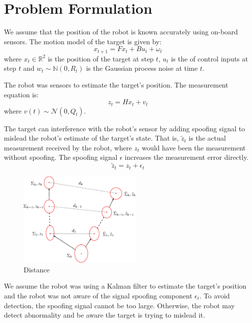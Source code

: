 \documentclass[letterpaper, 10 pt, conference]{ieeeconf}  %
\begin{document}
\section{Problem Formulation} \label{sec:probform}

We assume that the position of the robot is known accurately using on-board sensors. The motion model of the target is given by:
\begin{equation}  \label{robot}
  x_{t+1}=Fx_{t}+Bu_t+\omega_t
\end{equation}   
where $x_{t}\in\mathbb{R}^2$ is the position of the target at step $t$, $u_t$ is the of control inputs at step $t$ and $w_t\sim \mathbb{N}(0, R_t)$ is the Gaussian process noise at time $t$. 

The robot was sensors to estimate the target's position. The measurement equation is:
\begin{equation}
  \label{measurement}
   z_t= Hx_t +v_t
\end{equation}
where  $v(t) \sim \mathcal{N}(0,Q_t)$.

The target can interference with the robot's sensor by adding spoofing signal to mislead the robot's estimate of the target's state. That is, $\tilde{z}_t$ is the actual measurement received by the robot, where $z_t$ would have been the measurement without spoofing. The spoofing signal $\epsilon$ increases the measurement error directly. 
\begin{equation}
  \label{spoofmeasurement}
 \tilde{z}_t= z_t + \epsilon_t
\end{equation}

\begin{figure}[H]
  \centering
  \includegraphics[width=6cm]{figs/Distance.eps}
  \caption{Distance}
  \label{Distance}
\end{figure}

We assume the robot was using a Kalman filter to estimate the target's position and the robot was not aware of the signal spoofing component $\epsilon_t$. To avoid detection, the spoofing signal cannot be too large.  Otherwise, the robot may detect abnormality and be aware the target is trying to mislead it.
\end{document}
